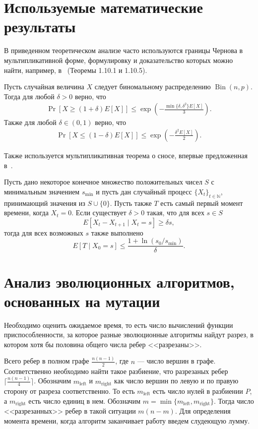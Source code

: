 \documentclass[times]{itmo-student-thesis}
\newcommand{\N}{{\mathbb N}}
\DeclareMathOperator{\Bin}{Bin}
\begin{document}
\section{Используемые математические результаты}

В приведенном теоретическом анализе часто используются границы Чернова в мультипликативной форме, формулировку и доказательство которых можно найти, например, в~\cite{Doerr20bookchapter} (Теоремы 1.10.1 и 1.10.5).

\begin{lemma}\label{lem:chernoff}
  Пусть случайная величина $X$ следует биномальному распределению $\Bin(n, p)$. Тогда для любой $\delta > 0$ верно, что
  \begin{align*}
    \Pr[X \ge (1 + \delta)E[X]] \le \exp\left(-\frac{\min\{\delta, \delta^2\}E[X]}{3}\right).
  \end{align*}
  Также для любой $\delta \in (0, 1)$ верно, что
  \begin{align*}
    \Pr[X \le (1 - \delta)E[X]] \le \exp\left(-\frac{\delta^2 E[X]}{2}\right).
  \end{align*}
\end{lemma}

Также используется мультипликативная теорема о сносе, впервые предложенная в~\cite{DoerrJW10}.

\begin{theorem}\label{thm:mult-drift}
  Пусть дано некоторое конечное множество положительных чисел $S$ с минимальным значением $s_{\min}$ и пусть дан случайный процесс $\{X_t\}_{t \in \N}$, принимающий значения из $S \cup \{0\}$. Пусть также $T$ есть самый первый момент времени, когда $X_t = 0$. Если существует $\delta > 0$ такая, что для всех $s \in S$
  \[
    E\left[X_t - X_{t + 1} \mid X_t = s\right] \ge \delta s,
  \]
  тогда для всех возможных $s$ также выполнено
  \[
    E[T \mid X_0 = s] \le \frac{1 + \ln(s_0/s_{\min})}{\delta}.
  \]
\end{theorem}

\section{Анализ эволюционных алгоритмов, основанных на мутации}
Необходимо оценить ожидаемое время, то есть число вычислений функции приспособленности, за которое разные эволюционные алгоритмы найдут разрез, в котором хотя бы половина общего числа ребер <<разрезаны>>.

Всего ребер в полном графе $\frac{n(n-1)}{2}$, где $n$ --- число вершин в графе.
Соответственно необходимо найти такое разбиение, что разрезаных ребер $\lceil \frac{n(n-1)}{4} \rceil$.
Обозначим $m_{\text{left}}$ и $m_{\text{right}}$ как число вершин по левую и по правую сторону от разреза соответственно. То есть $m_{\text{left}}$ есть число нулей в разбиении $P$, а $m_{\text{right}}$ есть число единиц в нем.
Обозначим $m = \min\{m_{\text{left}}, m_{\text{right}}\}$.
Тогда число <<разрезанных>> ребер в такой ситуации $m(n-m)$. Для определения момента времени, когда алгоритм заканчивает работу введем слудеющую лумму.
\end{document}
